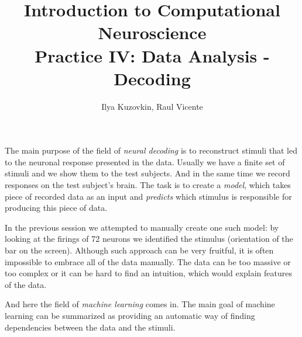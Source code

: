 \documentclass[a4paper,11pt]{article}
\author{\large{Ilya Kuzovkin, Raul Vicente}}
\title{\huge{Introduction to Computational Neuroscience}\\\LARGE{Practice IV: Data Analysis - Decoding}}
\begin{document}
\maketitle


%
%
The main purpose of the field of \emph{neural decoding} is to reconstruct stimuli that led to the neuronal response presented in the data. Usually we have a finite set of stimuli and we show them to the test subjects. And in the same time we record responses on the test subject's brain. The task is to create a \emph{model}, which takes piece of recorded data as an input and \emph{predicts} which stimulus is responsible for producing this piece of data.

In the previous session we attempted to manually create one such model: by looking at the firings of 72 neurons we identified the stimulus (orientation of the bar on the screen). Although such approach can be very fruitful, it is often impossible to embrace all of the data manually. The data can be too massive or too complex or it can be hard to find an intuition, which would explain features of the data.

And here the field of \emph{machine learning} comes in. The main goal of machine learning can be summarized as providing an automatic way of finding dependencies between the data and the stimuli.\\
\end{document}
